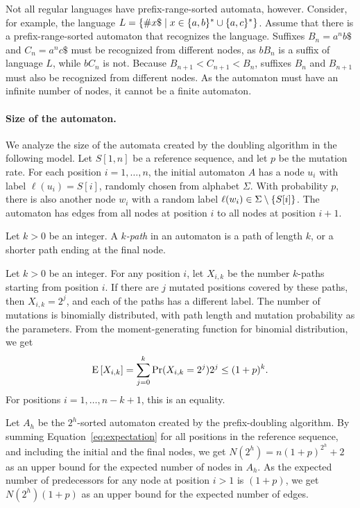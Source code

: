 Not all regular languages have prefix-range-sorted automata, however. Consider, for example, the language $L = \{  \# x \$ \mid x \in \{ a, b \}^{\ast} \cup \{ a, c \}^{\ast} \}$. Assume that there is a prefix-range-sorted automaton that recognizes the language. Suffixes $B_{n} = a^{n} b \$$ and $C_{n} = a^{n} c \$$ must be recognized from different nodes, as $bB_{n}$ is a suffix of language $L$, while $bC_{n}$ is not. Because $B_{n+1} < C_{n+1} < B_{n}$, suffixes $B_{n}$ and $B_{n+1}$ must also be recognized from different nodes. As the automaton must have an infinite number of nodes, it cannot be a finite automaton.

\paragraph{Size of the automaton.}

We analyze the size of the automata created by the doubling algorithm in the following model. 
Let $S[1,n]$ be a reference sequence, and let $p$ be the mutation rate. For each 
position $i = 1, \dots, n$, the initial automaton $A$ has a node $u_{i}$ with 
label $\ell(u_{i}) = S[i]$, randomly chosen from alphabet $\Sigma$. With 
probability $p$, there is also another node $w_{i}$ with a random label 
$\ell(w_{i}) \in \Sigma \setminus \{ S[i] \}$. The automaton has edges from all nodes at position $i$ to all nodes at position $i+1$.

\begin{definition}
Let $k > 0$ be an integer. A {\em $k$-path} in an automaton is a path of length $k$, or a shorter path ending at the final node.
\end{definition}

Let $k > 0$ be an integer. For any position $i$, let $X_{i,k}$ be the number $k$-paths starting from position $i$. If there are $j$ mutated positions covered by these paths, then $X_{i,k} = 2^{j}$, and each of the paths has a different label. The number of mutations is binomially distributed, with path length and mutation probability as the parameters. From the moment-generating function for binomial distribution, we get
\begin{equation}\label{eq:expectation}
\mathrm{E}\left[ X_{i,k} \right] = \sum_{j=0}^{k} \Pr(X_{i,k} = 2^{j}) 2^{j} \le (1+p)^{k}.
\end{equation}
For positions $i = 1, \dots, n - k + 1$, this is an equality.

Let $A_{h}$ be the $2^{h}$-sorted automaton created by the prefix-doubling algorithm. By summing Equation~\ref{eq:expectation} for all positions in the reference sequence, and including the initial and the final nodes, we get $N(2^{h}) = n(1+p)^{2^{h}} + 2$ as an upper bound for the expected number of nodes in $A_{h}$. As the expected number of predecessors for any node at position $i > 1$ is $(1+p)$, we get $N(2^{h})(1+p)$ as an upper bound for the expected number of edges.

